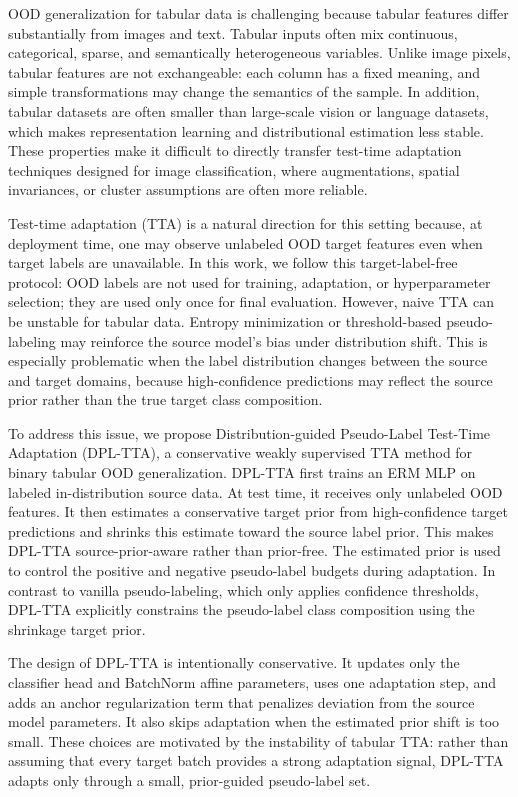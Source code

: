 \documentclass{article}
\begin{document}
OOD generalization for tabular data is challenging because tabular features differ substantially from images and text. Tabular inputs often mix continuous, categorical, sparse, and semantically heterogeneous variables. Unlike image pixels, tabular features are not exchangeable: each column has a fixed meaning, and simple transformations may change the semantics of the sample. In addition, tabular datasets are often smaller than large-scale vision or language datasets, which makes representation learning and distributional estimation less stable. These properties make it difficult to directly transfer test-time adaptation techniques designed for image classification, where augmentations, spatial invariances, or cluster assumptions are often more reliable.

Test-time adaptation (TTA) is a natural direction for this setting because, at deployment time, one may observe unlabeled OOD target features even when target labels are unavailable. In this work, we follow this target-label-free protocol: OOD labels are not used for training, adaptation, or hyperparameter selection; they are used only once for final evaluation. However, naive TTA can be unstable for tabular data. Entropy minimization or threshold-based pseudo-labeling may reinforce the source model's bias under distribution shift. This is especially problematic when the label distribution changes between the source and target domains, because high-confidence predictions may reflect the source prior rather than the true target class composition.

To address this issue, we propose Distribution-guided Pseudo-Label Test-Time Adaptation (DPL-TTA), a conservative weakly supervised TTA method for binary tabular OOD generalization. DPL-TTA first trains an ERM MLP on labeled in-distribution source data. At test time, it receives only unlabeled OOD features. It then estimates a conservative target prior from high-confidence target predictions and shrinks this estimate toward the source label prior. This makes DPL-TTA source-prior-aware rather than prior-free. The estimated prior is used to control the positive and negative pseudo-label budgets during adaptation. In contrast to vanilla pseudo-labeling, which only applies confidence thresholds, DPL-TTA explicitly constrains the pseudo-label class composition using the shrinkage target prior.

The design of DPL-TTA is intentionally conservative. It updates only the classifier head and BatchNorm affine parameters, uses one adaptation step, and adds an anchor regularization term that penalizes deviation from the source model parameters. It also skips adaptation when the estimated prior shift is too small. These choices are motivated by the instability of tabular TTA: rather than assuming that every target batch provides a strong adaptation signal, DPL-TTA adapts only through a small, prior-guided pseudo-label set.
\end{document}
